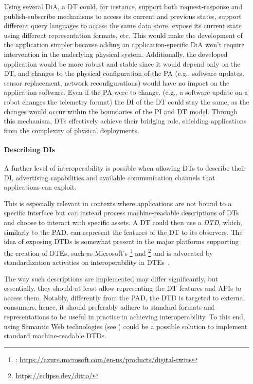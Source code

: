 Using several \ac{DiA}, a \ac{DT} could, for instance, support both request-response and publish-subscribe mechanisms to access its current and previous states, support different query languages to access the same data store, expose its current state using different representation formats, etc.
%
This would make the development of the application simpler because adding an application-specific \ac{DiA} won't require intervention in the underlying physical system. 
%
Additionally, the developed application would be more robust and stable since it would depend only on the \ac{DT}, and changes to the physical configuration of the \ac{PA} (e.g., software updates, sensor replacement, network reconfigurations) would have no impact on the application software.
%
Even if the \ac{PA} were to change, (e.g., a software update on a robot changes the telemetry format) the \ac{DI} of the \ac{DT} could stay the same, as the changes would occur within the boundaries of the \ac{PI} and \ac{DT} model.
%
Through this mechanism, \acp{DT} effectively achieve their bridging role, shielding applications from the complexity of physical deployments.

\paragraph{Describing \aclp{DI}}

A further level of interoperability is possible when allowing \acp{DT} to describe their \ac{DI}, advertising capabilities and available communication channels that applications can exploit.

This is especially relevant in contexts where applications are not bound to a specific interface but can instead process machine-readable descriptions of \acp{DT} and choose to interact with specific assets.
%
A \ac{DT} could then use a \emph{\ac{DTD}}, which, similarly to the \ac{PAD}, can represent the features of the \ac{DT} to its observers.
%
The idea of exposing \acp{DTD} is somewhat present in the major platforms supporting the creation of \acp{DTE}, such as 
Microsoft's \azureTwin{}\footnote{\azureTwin{}: \url{https://azure.microsoft.com/en-us/products/digital-twins}} and \ditto{}\footnote{\ditto{} \url{https://eclipse.dev/ditto/}} and is advocated by standardization activities on interoperability in \acp{DTE}~\cite{etsi-dt-comm-requirements-2024}.

The way such descriptions are implemented may differ significantly, but essentially, they should at least allow representing the \ac{DT}  features and APIs to access them.
%
Notably, differently from the \ac{PAD}, the \ac{DTD} is targeted to external consumers, hence, it should preferably adhere to standard formats and representations to be useful in practice in achieving interoperability.
%
To this end, using Semantic Web technologies (see ) could be a possible solution to implement standard machine-readable \acp{DTD}.

